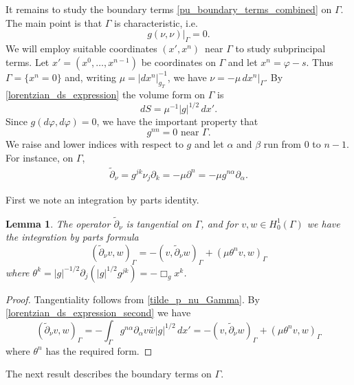 \documentclass[11pt,letterpaper]{amsart}
\newtheorem{Lemma}[Theorem]{Lemma}
\theoremstyle{definition}
\numberwithin{equation}{section}
\newcommand{\p}{\partial}
\def\p{\partial}
\begin{document}
It remains to study the boundary terms \eqref{pu_boundary_terms_combined} on $\Gamma$. The main point is that $\Gamma$ is characteristic, i.e.\ 
\[
g(\nu, \nu)|_{\Gamma} = 0.
\]
We will employ suitable coordinates $(x', x^n)$ near $\Gamma$ to study subprincipal terms. Let $x' = (x^0, \ldots, x^{n-1})$ be coordinates on $\Gamma$ and let $x^n = \varphi-s$. Thus $\Gamma = \{ x^n = 0 \}$ and, writing $\mu = |dx^n|_{g_T}^{-1}$, we have $\nu = -\mu \,dx^n|_{\Gamma}$.
By \eqref{lorentzian_ds_expression} the volume form on $\Gamma$ is 
\begin{equation} \label{lorentzian_ds_expression_second}
dS = \mu^{-1} |g|^{1/2} \,dx'.
\end{equation}
Since $g(d\varphi, d\varphi) = 0$, we have the important property that 
\[
g^{nn} = 0 \text{ near $\Gamma$}.
\]
We raise and lower indices with respect to $g$ and let $\alpha$ and $\beta$ run from $0$ to $n-1$. For instance, on $\Gamma$,
    \begin{align}\label{tilde_p_nu_Gamma}
\tilde{\p}_{\nu} = g^{jk} \nu_j \p_k = -\mu \p^n = -\mu g^{n\alpha} \p_{\alpha}.
    \end{align}

First we note an integration by parts identity.

\begin{Lemma} \label{lemma_tildepnu_gamma_tangential}
The operator $\tilde{\p}_{\nu}$ is tangential on $\Gamma$, and for $v, w \in H^1_0(\Gamma)$ we have the integration by parts formula 
\begin{equation*}
(\tilde{\p}_{\nu} v, w)_{\Gamma} =  -(v, \tilde{\p}_{\nu} w)_{\Gamma} + (\mu \theta^n v, w)_{\Gamma}
\end{equation*}
where $\theta^k = |g|^{-1/2} \p_j(|g|^{1/2} g^{jk}) = -\Box_g x^k$.
\end{Lemma}
\begin{proof}
Tangentiality follows from \eqref{tilde_p_nu_Gamma}. By \eqref{lorentzian_ds_expression_second} we have 
\begin{equation*}
(\tilde{\p}_{\nu} v, w)_{\Gamma} =  - \int_{\Gamma} g^{n\alpha} \p_{\alpha} v \bar{w} |g|^{1/2} \,dx' = -(v, \tilde{\p}_{\nu} w)_{\Gamma} + (\mu \theta^n v, w)_{\Gamma}
\end{equation*}
where $\theta^n$ has the required form.
\end{proof}

The next result describes the boundary terms on $\Gamma$.
\end{document}
